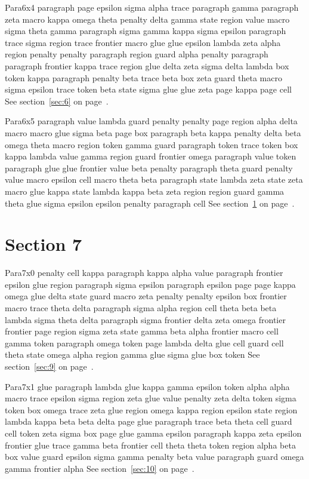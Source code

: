 \documentclass{article}
\begin{document}
Para6x4 paragraph page epsilon sigma alpha trace paragraph gamma paragraph zeta macro kappa omega theta penalty delta gamma state region value macro sigma theta gamma paragraph sigma gamma kappa sigma epsilon paragraph trace sigma region trace frontier macro glue glue epsilon lambda zeta alpha region penalty penalty paragraph region guard alpha penalty paragraph paragraph frontier kappa trace region glue delta zeta sigma delta lambda box token kappa paragraph penalty beta trace beta box zeta guard theta macro sigma epsilon trace token beta state sigma glue glue zeta page kappa page cell See section~\ref{sec:6} on page~\pageref{sec:22}.

Para6x5 paragraph value lambda guard penalty penalty page region alpha delta macro macro glue sigma beta page box paragraph beta kappa penalty delta beta omega theta macro region token gamma guard paragraph token trace token box kappa lambda value gamma region guard frontier omega paragraph value token paragraph glue glue frontier value beta penalty paragraph theta guard penalty value macro epsilon cell macro theta beta paragraph state lambda zeta state zeta macro glue kappa state lambda kappa beta zeta region region guard gamma theta glue sigma epsilon epsilon penalty paragraph cell See section~\ref{sec:7} on page~\pageref{sec:23}.

\section{Section 7}\label{sec:7}
Para7x0 penalty cell kappa paragraph kappa alpha value paragraph frontier epsilon glue region paragraph sigma epsilon paragraph epsilon page page kappa omega glue delta state guard macro zeta penalty penalty epsilon box frontier macro trace theta delta paragraph sigma alpha region cell theta beta beta lambda sigma theta delta paragraph sigma frontier delta zeta omega frontier frontier page region sigma zeta state gamma beta alpha frontier macro cell gamma token paragraph omega token page lambda delta glue cell guard cell theta state omega alpha region gamma glue sigma glue box token See section~\ref{sec:9} on page~\pageref{sec:21}.

Para7x1 glue paragraph lambda glue kappa gamma epsilon token alpha alpha macro trace epsilon sigma region zeta glue value penalty zeta delta token sigma token box omega trace zeta glue region omega kappa region epsilon state region lambda kappa beta beta delta page glue paragraph trace beta theta cell guard cell token zeta sigma box page glue gamma epsilon paragraph kappa zeta epsilon frontier glue trace gamma beta frontier cell theta theta token region alpha beta box value guard epsilon sigma gamma penalty beta value paragraph guard omega gamma frontier alpha See section~\ref{sec:10} on page~\pageref{sec:22}.
\end{document}
